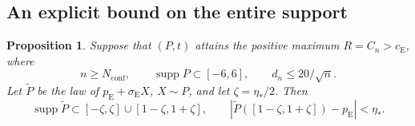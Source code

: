 \documentclass[aop]{imsart}
\theoremstyle{plain}
\newtheorem{proposition}[theorem]{Proposition}
\theoremstyle{definition}
\theoremstyle{definition}
\newcommand{\ce}{c_{\mathrm E}}
\newcommand{\pe}{p_{\mathrm E}}
\newcommand{\se}{\sigma_{\mathrm E}}
\DeclareMathOperator{\supp}{supp}
\begin{document}
\subsection{An explicit bound on the entire support}

\begin{proposition}\label{prop:effective-confinement}
Suppose that $(P,t)$ attains the positive maximum $R=C_n>\ce$,
where
\[
 n\ge N_{\mathrm{conf}},\qquad
 \supp P\subset[-6,6],\qquad d_n\le20/\sqrt n.
\]
Let $\widetilde P$ be the law of $\pe+\se X$, $X\sim P$, and
let $\zeta=\eta_*/2$.  Then
\begin{equation}\label{eq:effective-full-support}
 \supp\widetilde P\subset[-\zeta,\zeta]\cup[1-\zeta,1+\zeta],
 \qquad
 |\widetilde P([1-\zeta,1+\zeta])-\pe|<\eta_*.
\end{equation}
\end{proposition}
\end{document}
